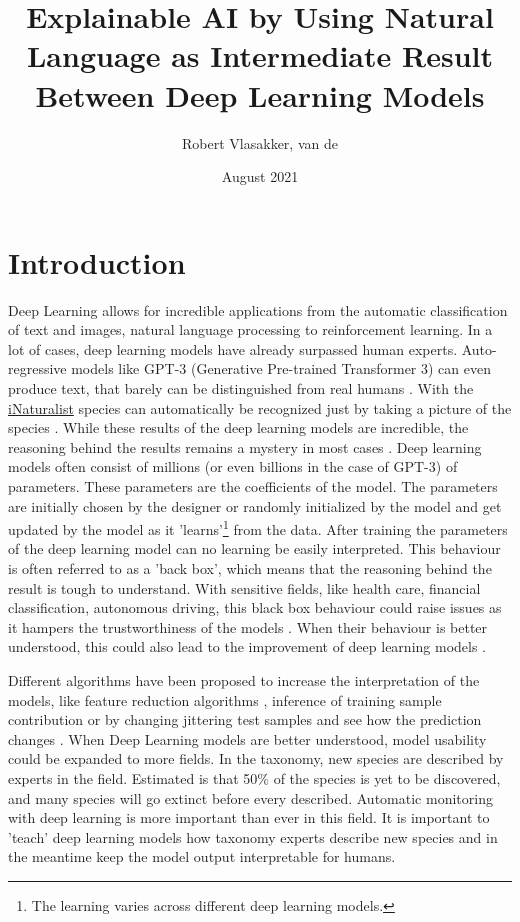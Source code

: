 \documentclass{article}
\title{Explainable AI by Using Natural Language as Intermediate Result Between Deep Learning Models}
\author{Robert Vlasakker, van de}
\date{August 2021}
\begin{document}
\maketitle

\section{Introduction}
Deep Learning allows for incredible applications from the automatic classification of text and images, natural language processing to reinforcement learning.
In a lot of cases, deep learning models have already surpassed human experts.
Auto-regressive models like GPT-3 (Generative Pre-trained Transformer 3) can even produce text, that barely can be distinguished from real humans \cite{brown_language_2020}. With the \href{https://www.inaturalist.org/}{iNaturalist} species can automatically be recognized just by taking a picture of the species \cite{radford_learning_2021}.
While these results of the deep learning models are incredible, the reasoning behind the results remains a mystery in most cases \cite{li_interpretable_2021, losch_interpretability_2019}.
Deep learning models often consist of millions (or even billions in the case of GPT-3) of parameters.
These parameters are the coefficients of the model.
The parameters are initially chosen by the designer or randomly initialized by the model and get updated by the model as it 'learns'\footnote{The learning varies across different deep learning models.} from the data.
After training the parameters of the deep learning model can no learning be easily interpreted.
This behaviour is often referred to as a 'back box', which means that the reasoning behind the result is tough to understand.
With sensitive fields, like health care, financial classification, autonomous driving, this black box behaviour could raise issues as it hampers the trustworthiness of the models \cite{carvalho_machine_2019}.
When their behaviour is better understood, this could also lead to the improvement of deep learning models \cite{amershi_modeltracker_2015}.

Different algorithms have been proposed to increase the interpretation of the models, like feature reduction algorithms \cite{ribeiro_why_2016}, inference of training sample contribution \cite{koh_understanding_2020} or by changing jittering test samples and see how the prediction changes \cite{li_understanding_2017}.
When Deep Learning models are better understood, model usability could be expanded to more fields.
In the taxonomy, new species are described by experts in the field. 
Estimated is that 50\% of the species is yet to be discovered, and many species will go extinct before every described.
Automatic monitoring with deep learning is more important than ever in this field.
It is important to 'teach' deep learning models how taxonomy experts describe new species and in the meantime keep the model output interpretable for humans.
\end{document}
